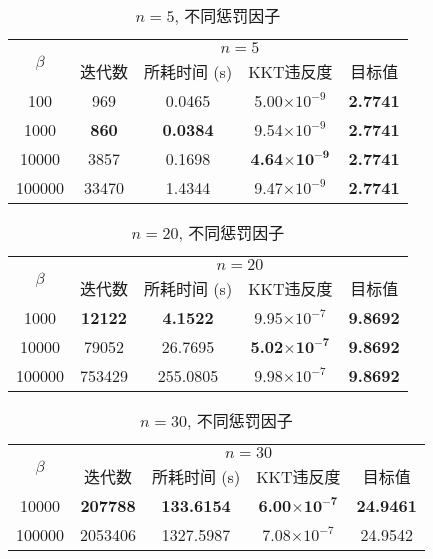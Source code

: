 \begin{table}[htbp]
	\renewcommand{\captionfont}{\small}
    \centering
    \caption{$n=5$, 不同惩罚因子}
    \label{n5beta}
    \vskip 4mm
    \begin{tabular}{c|c|c|c|c}
        \hline
        \multirow{2}{*}{$\beta$} & \multicolumn{4}{c}{$n=5$}\\\cline{2-5}
          & 迭代数 & 所耗时间 (s) & KKT违反度 & 目标值\\\hline
        100 & 969 & 0.0465 & 5.00$\times10^{-9}$ & \textbf{2.7741}\\\hline
        1000 & \textbf{860} & \textbf{0.0384} & 9.54$\times10^{-9}$ & \textbf{2.7741}\\\hline
        10000 & 3857 & 0.1698 & \textbf{4.64$\mathbf{\times10^{-9}}$} & \textbf{2.7741}\\\hline
        100000 & 33470 & 1.4344 & 9.47$\times10^{-9}$ & \textbf{2.7741}\\\hline
    \end{tabular}
\end{table}

\begin{table}[htbp]
    \renewcommand{\captionfont}{\small}
    \centering
    \caption{$n=20$, 不同惩罚因子}
    \label{n20beta}
    \vskip 4mm
    \begin{tabular}{c|c|c|c|c}
        \hline
        \multirow{2}{*}{$\beta$} & \multicolumn{4}{c}{$n=20$}\\\cline{2-5}
          & 迭代数 & 所耗时间 (s) & KKT违反度 & 目标值\\\hline
        1000 & \textbf{12122} & \textbf{4.1522} & 9.95$\times10^{-7}$ & \textbf{9.8692}\\\hline
        10000 & 79052 & 26.7695 & \textbf{5.02$\mathbf{\times10^{-7}}$} & \textbf{9.8692}\\\hline
        100000 & 753429 & 255.0805 & 9.98$\times10^{-7}$ & \textbf{9.8692}\\\hline
    \end{tabular}
\end{table}

\begin{table}[htbp]
	\renewcommand{\captionfont}{\small}
    \centering
    \caption{$n=30$, 不同惩罚因子}
    \label{n30beta}
    \vskip 4mm
    \begin{tabular}{c|c|c|c|c}
        \hline
        \multirow{2}{*}{$\beta$} & \multicolumn{4}{c}{$n=30$}\\\cline{2-5}
          & 迭代数 & 所耗时间 (s) & KKT违反度 & 目标值\\\hline
        10000 & \textbf{207788} & \textbf{133.6154} & \textbf{6.00$\mathbf{\times10^{-7}}$} & \textbf{24.9461}\\\hline
        100000 & 2053406 & 1327.5987 & 7.08$\times10^{-7}$ & 24.9542\\\hline
    \end{tabular}
\end{table}

